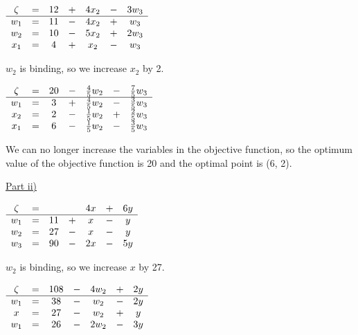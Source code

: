 \documentclass[letterpaper,12pt]{article}
\begin{document}
\begin{center}
	$\begin{array}{ c c c c c c c c  }
		\zeta & = & 12 & + & 4x_2 & - & 3w_3 \\
		\hline
		w_1 & = & 11 & - & 4x_2 & + & w_3 \\
		w_2 & = & 10 & - & 5x_2 & + & 2w_3 \\
		x_1 & = & 4 & + & x_2 & - & w_3 \\
	\end{array}$ \\
\end{center}

$w_2$ is binding, so we increase $x_2$ by 2. \\

\begin{center}
	$\begin{array}{ c c c c c c c c  }
		\zeta & = & 20 & - & \tfrac{4}{5}w_2 & - & \tfrac{7}{5}w_3 \\
		\hline
		w_1 & = & 3 & + & \tfrac{4}{5}w_2 & - & \tfrac{3}{5}w_3 \\
		x_2 & = & 2 & - & \tfrac{1}{5}w_2 & + & \tfrac{2}{5}w_3 \\
		x_1 & = & 6 & - & \tfrac{1}{5}w_2 & - & \tfrac{3}{5}w_3\\
	\end{array}$
\end{center}

We can no longer increase the variables in the objective function, so the optimum value of the objective function is 20 and the optimal point is (6, 2).

\underline{Part ii)}


\begin{center}
	$\begin{array}{ c c c c c c c c  }
	\zeta & = & & & 4x & + & 6y \\
	\hline
	w_1 & = & 11 & + & x & - & y \\
	w_2 & = & 27 & - & x & - & y \\
	w_3 & = & 90 & - & 2x & - & 5y \\
	\end{array}$ \\
\end{center}

$w_2$ is binding, so we increase $x$ by 27. \\

\begin{center}
	$\begin{array}{ c c c c c c c c  }
	\zeta & = & 108 & - & 4w_2 & + & 2y \\
	\hline
	w_1 & = & 38 & - & w_2 & - & 2y \\
	x & = & 27 & - & w_2 & + & y \\
	w_1 & = & 26 & - & 2w_2 & - & 3y \\
	\end{array}$ \\
\end{center}
\end{document}
